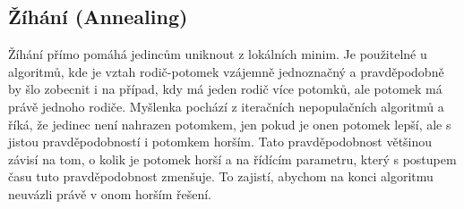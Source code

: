 \subsection{Žíhání (Annealing)}

Žíhání přímo pomáhá jedincům uniknout z lokálních minim. Je použitelné u algoritmů, kde je vztah rodič-potomek vzájemně jednoznačný a pravděpodobně by šlo zobecnit i na případ, kdy má jeden rodič více potomků, ale potomek má právě jednoho rodiče. Myšlenka pochází z iteračních nepopulačních algoritmů a říká, že jedinec není nahrazen potomkem, jen pokud je onen potomek lepší, ale s jistou pravděpodobností i potomkem horším. Tato pravděpodobnost většinou závisí na tom, o kolik je potomek horší a na řídícím parametru, který s postupem času tuto pravděpodobnost zmenšuje. To zajistí, abychom na konci algoritmu neuvázli právě v onom horším řešení.

